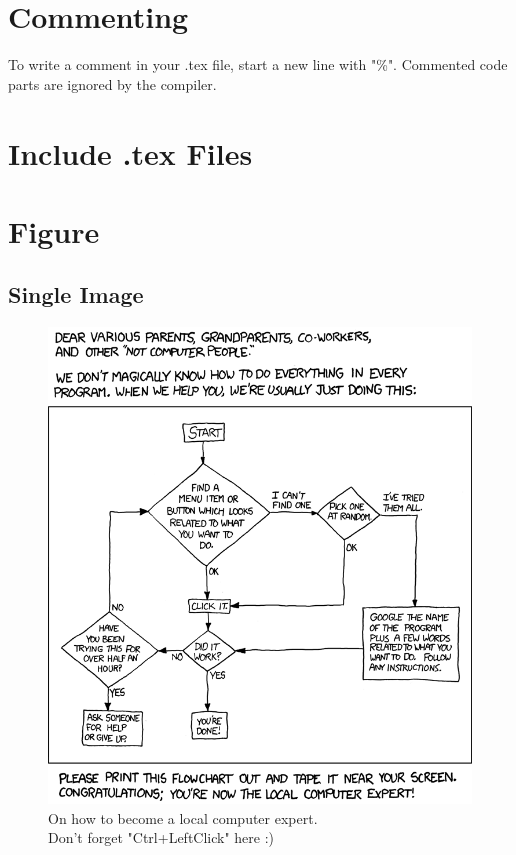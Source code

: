 \section{Commenting}

To write a comment in your .tex file, start a new line with "\%".
Commented code parts are ignored by the compiler.


\section{Include .tex Files}
\label{text:include-files}




\section{Figure}

\subsection{Single Image}


\begin{figure}[H]
  \begin{center}
    \includegraphics[width=0.75\columnwidth]{files/images/xkcd_tech_support_cheat_sheet.png}
  \end{center}
  \caption{On how to become a local computer expert. \\ Don't forget "Ctrl+LeftClick" here :) }
  \label{fig:xkcd}
\end{figure}


